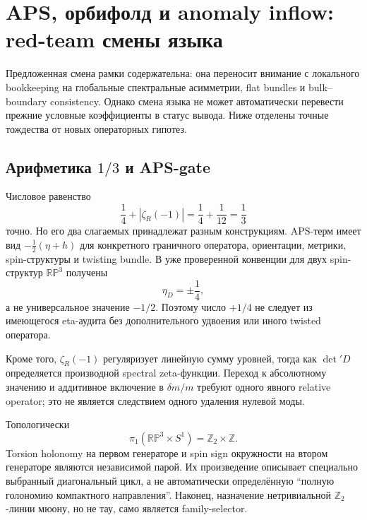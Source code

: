 \chapter{APS, орбифолд и anomaly inflow: red-team смены языка}

Предложенная смена рамки содержательна: она переносит внимание с локального
bookkeeping на глобальные спектральные асимметрии, flat bundles и
bulk--boundary consistency. Однако смена языка не может автоматически
перевести прежние условные коэффициенты в статус вывода. Ниже отделены
точные тождества от новых операторных гипотез.

\section{Арифметика \texorpdfstring{\(1/3\)}{1/3} и APS-gate}

Числовое равенство
\begin{equation}
 \frac14+\left|\zeta_R(-1)\right|
 =\frac14+\frac1{12}=\frac13
\end{equation}
точно. Но его два слагаемых принадлежат разным конструкциям. APS-терм имеет
вид \(-\frac12(\eta+h)\) для конкретного граничного оператора, ориентации,
метрики, spin-структуры и twisting bundle. В уже проверенной конвенции для
двух spin-структур \(\mathbb{RP}^3\) получены
\begin{equation}
 \eta_D=\pm\frac14,
\end{equation}
а не универсальное значение \(-1/2\). Поэтому число \(+1/4\) не следует из
имеющегося eta-аудита без дополнительного удвоения или иного twisted
оператора.

Кроме того, \(\zeta_R(-1)\) регуляризует линейную сумму уровней, тогда как
\(\det' D\) определяется производной spectral zeta-функции. Переход к
абсолютному значению и аддитивное включение в \(\delta m/m\) требуют одного
явного relative operator; это не является следствием одного удаления
нулевой моды.

Топологически
\begin{equation}
 \pi_1(\mathbb{RP}^3\times S^1)=\mathbb Z_2\times\mathbb Z.
\end{equation}
Torsion holonomy на первом генераторе и spin sign окружности на втором
генераторе являются независимой парой. Их произведение описывает специально
выбранный диагональный цикл, а не автоматически определённую ``полную
голономию компактного направления''. Наконец, назначение нетривиальной
\(\mathbb Z_2\)-линии мюону, но не тау, само является family-selector.

